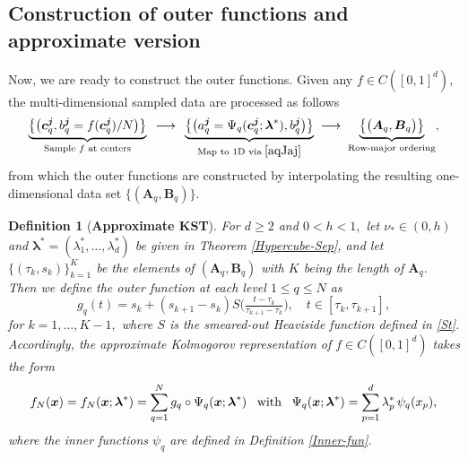 \documentclass[10pt,reqno,final]{amsart}
\theoremstyle{remark}
\theoremstyle{definition}
\newtheorem{definition}{\bf Definition}[section]
\newcommand{\bs}[1]{\boldsymbol{#1}}
\begin{document}
\subsection{Construction of outer functions and approximate version} 
Now, we are ready to construct the outer functions. Given any $f\in C([0,1]^d),$   the multi-dimensional sampled data are processed as follows 
  \begin{equation}\label{flowmap-A1}
\underbrace{\big\{\big(\bs c_q^{\bs j}, b_q^{\bs j}=f(\bs c_q^{\bs j})/N\big)\big\}}_{\text{Sample
$f$ at centers}}\;\;{\longrightarrow} \;\; 
 \underbrace{\big\{\big( a_q^{\bs j}=\Psi_q(\bs c_q^{\bs j};\bs \lambda^*), b_q^{\bs j}\big)\big\}}_{\text{Map to 1D via}\; \eqref{aqJaj}}
\;\longrightarrow \;  
    \underbrace{\big\{\big(\bs A_q, \bs B_q\big)\big\}}_{\text{Row-major ordering}},
\end{equation}
from which the outer functions are constructed by interpolating the resulting
one-dimensional data set $\{(\bs A_q,\bs B_q)\}$. 
\begin{definition}[{\bf  Approximate KST}]\label{Defn:Outer01} {\em  For $d\ge 2$ and   $0<h<1,$
let $\nu_*\in (0,h)$ and $\bs \lambda^*=(\lambda_1^*, \ldots, \lambda_d^*)$  be  given in Theorem \ref{Hypercube-Sep}, and let $\{(\tau_k, s_k)\}_{k=1}^{K}$ be the elements of 
$(\bs A_q, \bs B_q)$ with $K$ being the length of $\bs A_q.$ Then we define the outer function at each level $1\le q\le N$ as 
\begin{equation}\label{qj2g01-A}
  g_q(t)=s_k +(s_{k+1}-s_k) S\big(\tfrac{t-\tau_k}{\tau_{k+1}-\tau_k}\big), \quad t\in  [\tau_k, \tau_{k+1}],
\end{equation}
for $k=1,\ldots, K-1,$ where $S$ is the smeared-out Heaviside function  defined in \eqref{St}. Accordingly, the approximate Kolmogorov  representation of $f\in C([0,1]^d)$  takes the form 
\begin{equation}\label{0fx-KA-form-B00}
      f_N(\bs x)=f_N(\bs x; \bs \lambda^*)=\sum_{q=1}^{N} g_q\circ\Psi_q(\bs x;\bs \lambda^*)\;\;\;
      {\rm with}
      \;\;\; \Psi_q(\bs x;\bs \lambda^*)=\sum_{p=1}^d \lambda_p^*\, \psi_q(x_p),
\end{equation}
where the inner functions $\psi_q$ are defined in Definition \ref{Inner-fun}.
}
\end{definition}
\end{document}

